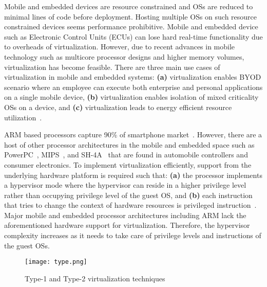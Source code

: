 \documentclass[journal, 10pt]{IEEEtran}
\begin{document}
Mobile and embedded devices are resource constrained and OSs are reduced to minimal lines of code before deployment. Hosting multiple OSs on such resource constrained devices seems performance prohibitive. Mobile and embedded device such as Electronic Control Units (ECUs) can lose hard real-time functionality due to overheads of virtualization. However, due to recent advances in mobile technology such as multicore processor designs and higher memory volumes, virtualization has become feasible. There are three main use cases of virtualization in mobile and embedded systems: \textbf{(a)} virtualization enables BYOD scenario where an employee can execute both enterprise and personal applications on a single mobile device, \textbf{(b)} virtualization enables isolation of mixed criticality OSs on a device, and \textbf{(c)} virtualization leads to energy efficient resource utilization~\cite{Shuja2012,Heiser2008,Shuja2014}. 

ARM based processors capture 90\% of smartphone market~\cite{Do2011}. However, there are a host of other processor architectures in the mobile and embedded space such as PowerPC~\cite{Mittal2013}, MIPS~\cite{Aguiar2011}, and SH-4A~\cite{Kanda2008} that are found in automobile controllers and consumer electronics. To implement virtualization efficiently, support from the underlying hardware platform is required such that: \textbf{(a)} the processor implements a hypervisor mode where the hypervisor can reside in a higher privilege level rather than occupying privilege level of the guest OS, and \textbf{(b)} each instruction that tries to change the context of hardware resources is privileged instruction~\cite{Penneman2013}. Major mobile and embedded processor architectures including ARM lack the aforementioned hardware support for virtualization. Therefore, the hypervisor complexity increases as it needs to take care of privilege levels and instructions of the guest OSs. 

\begin{figure*}
\centering
\texttt{[image: type.png]}
\caption {Type-1 and Type-2 virtualization techniques}
\label{Fig:class}
\end{figure*}
\end{document}
